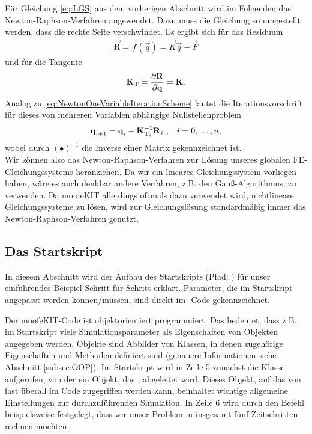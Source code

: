 \documentclass[12pt,bibstyle=none,pagenumberinfooter]{ifmdocument}
\begin{document}
F\"ur Gleichung \eqref{eq:LGS} aus dem vorherigen Abschnitt wird im Folgenden das Newton-Raphson-Verfahren angewendet. Dazu muss die Gleichung so umgestellt werden, dass die rechte Seite verschwindet. Es ergibt sich für das Residuum
\begin{gather*}
	\vec{\mathrm{R}} = \vec{f}(\vec{q}) = \vec{K}\vec{q} -\vec{F}
\end{gather*}
und für die Tangente
\begin{gather*}
	\mbox{\boldmath $\mathrm{\mathrm{K}}$}_\mathrm{T} = \frac{\partial \mbox{\boldmath $\mathrm{\mathrm{R}}$}}{\partial \mbox{\boldmath $\mathrm{q}$}}= \mbox{\boldmath $\mathrm{\mathrm{K}}$}\text{.}
\end{gather*}
Analog zu \eqref{eq:NewtonOneVariableIterationScheme} lautet die Iterationsvorschrift für dieses von mehreren Variablen abhängige Nullstellenproblem
\begin{gather*}
	\mbox{\boldmath $\mathrm{q}$}_{i+1}=\mbox{\boldmath $\mathrm{q}$}_i- {\mbox{\boldmath $\mathrm{\mathrm{K}}$}_{\mathrm{T}_i}^{-1}}\mbox{\boldmath $\mathrm{\mathrm{R}}$}_i~\text{,}\quad i=0,\dots,n\text{,}
	\label{eq:NewtonOneVariableIterationScheme}
\end{gather*}
wobei durch $(\bullet )^{-1}$ die Inverse einer Matrix gekennzeichnet ist.\\
Wir können also das Newton-Raphson-Verfahren zur Lösung unseres globalen FE-Gleichungssystems heranziehen. Da wir ein lineares Gleichungssystem vorliegen haben, wäre es auch denkbar andere Verfahren, z.B. den Gauß-Algorithmus, zu verwenden. Da moofeKIT allerdings oftmals dazu verwendet wird, nichtlineare Gleichungssysteme zu lösen, wird zur Gleichungslösung standardmäßig immer das Newton-Raphson-Verfahren genutzt.

\subsection{Das Startskript}\label{subsec:startScript}
In diesem Abschnitt wird der Aufbau des Startskripts  (Pfad: ) f\"ur unser einf\"uhrendes Beispiel Schritt f\"ur Schritt erkl\"art. Parameter, die im Startskript angepasst werden k\"onnen/m\"ussen, sind direkt im \matlab -Code gekennzeichnet. 

Der moofeKIT-Code ist objektorientiert programmiert. Das bedeutet, dass z.B. im Startskript viele Simulationsparameter als Eigenschaften von Objekten angegeben werden. Objekte sind Abbilder von Klassen, in denen zugehörige Eigenschaften und Methoden definiert sind (genauere Informationen siehe Abschnitt \ref{subsec:OOP}). Im Startskript wird in Zeile 5 zun\"achst die Klasse  aufgerufen, von der ein Objekt, das , abgeleitet wird. Dieses Objekt, auf das von fast überall im Code zugegriffen werden kann, beinhaltet wichtige allgemeine Einstellungen zur durchzuführenden Simulation. In Zeile 6 wird durch den Befehl  beispielsweise festgelegt, dass wir unser Problem in insgesamt fünf Zeitschritten rechnen möchten.
\end{document}
